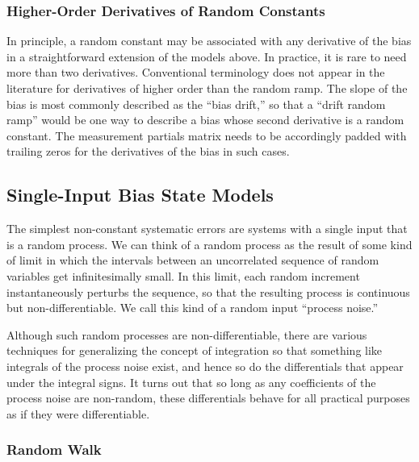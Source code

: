\subsubsection{Higher-Order Derivatives of Random Constants}

In principle, a random constant may be associated with any derivative of the bias in a straightforward extension of the models above.  In practice, it is rare to need more than two derivatives.  Conventional terminology does not appear in the literature for derivatives of higher order than the random ramp.  The slope of the bias is most commonly described as the ``bias drift,'' so that a ``drift random ramp'' would be one way to describe a bias whose second derivative is a random constant.  The measurement partials matrix needs to be accordingly padded with trailing zeros for the derivatives of the bias in such cases.

\subsection{Single-Input Bias State Models}

The simplest non-constant systematic errors are systems with a single input that is a random process.  We can think of a random process as the result of some kind of limit in which the intervals between an uncorrelated sequence of random variables get infinitesimally small.  In this limit, each random increment instantaneously perturbs the sequence, so that the resulting process is continuous but non-differentiable.  We call this kind of a random input ``process noise.''

Although such random processes are non-differentiable, there are various techniques for generalizing the concept of integration so that something like integrals of the process noise exist, and hence so do the differentials that appear under the integral signs.  It turns out that so long as any coefficients of the process noise are non-random, these differentials behave for all practical purposes as if they were differentiable.

\subsubsection{Random Walk}

